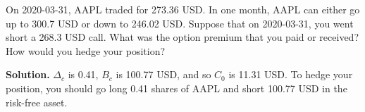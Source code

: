\noindent On 2020-03-31, AAPL traded for 273.36 USD. In one month, AAPL can either go up to 300.7 USD or down to 246.02 USD. Suppose that on 2020-03-31, you went short a 268.3 USD call. What was the option premium that you paid or received? How would you hedge your position?

\vspace{9pt}

\noindent\textbf{Solution.} $\Delta_{c}$ is 0.41, $B_{c}$ is 100.77 USD, and so $C_{0}$ is 11.31 USD. To hedge your position, you should go long 0.41 shares of AAPL and short 100.77 USD in the risk-free asset.
